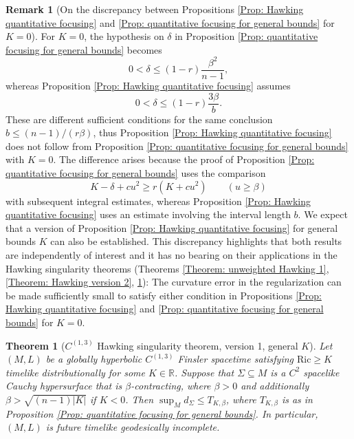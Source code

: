 \documentclass[a4paper,11pt]{article}
\numberwithin{equation}{section}
\theoremstyle{definition}
\newtheorem{Remark}[Definition]{Remark}
\theoremstyle{plain}
\newtheorem{Theorem}[Definition]{Theorem}
\newcommand{\Ric}{\mathrm{Ric}}
\begin{document}
\begin{Remark}[On the discrepancy between Propositions \ref{Prop: Hawking quantitative focusing} and \ref{Prop: quantitative focusing for general bounds} for $K = 0$]
For \(K=0\), the hypothesis on \(\delta\) in Proposition \ref{Prop: quantitative focusing for general bounds} becomes
\begin{equation*}
0<\delta\leq(1-r)\frac{\beta^2}{n-1},
\end{equation*}
whereas Proposition \ref{Prop: Hawking quantitative focusing} assumes
\begin{equation*}
0<\delta\leq(1-r)\frac{3\beta}{b}.
\end{equation*}
These are different sufficient conditions for the same conclusion \(b\leq(n-1)/(r\beta)\), thus Proposition \ref{Prop: Hawking quantitative focusing} does not follow from Proposition \ref{Prop: quantitative focusing for general bounds} with $K = 0$. 
The difference arises because the proof of Proposition \ref{Prop: quantitative focusing for general bounds} uses the comparison
\begin{equation*}
K-\delta+cu^2\geq r(K+cu^2)
\qquad (u\geq\beta)
\end{equation*}
with subsequent integral estimates, whereas Proposition \ref{Prop: Hawking quantitative focusing} uses an estimate involving the interval length $b$. 
We expect that a version of Proposition \ref{Prop: Hawking quantitative focusing} for general bounds $K$ can also be established. 
This discrepancy highlights that both results are independently of interest and it has no bearing on their applications in the Hawking singularity theorems (Theorems \ref{Theorem: unweighted Hawking 1}, \ref{Theorem: Hawking version 2}, \ref{Theorem: unweighted general Hawking 1}): 
The curvature error in the regularization can be made sufficiently small to satisfy either condition in Propositions \ref{Prop: Hawking quantitative focusing} and \ref{Prop: quantitative focusing for general bounds} for $K = 0$.
\end{Remark}


\begin{Theorem}[$C^{(1,3)}$ Hawking singularity theorem,
version 1, general $K$]
\label{Theorem: unweighted general Hawking 1}
Let $(M,L)$ be a globally hyperbolic $C^{(1,3)}$ Finsler spacetime satisfying $\Ric \geq K$ timelike distributionally for some $K\in\mathbb R$.
Suppose that $\Sigma\subseteq M$ is a $C^2$ spacelike Cauchy hypersurface that is $\beta$-contracting, where $\beta>0$ and additionally $\beta>\sqrt{(n-1)|K|}$ if $K<0$. 
Then $\sup_M d_\Sigma\leq T_{K,\beta}$, where $T_{K,\beta}$ is as in Proposition \ref{Prop: quantitative focusing for general bounds}.
In particular, $(M,L)$ is future timelike geodesically incomplete.
\end{Theorem}
\end{document}
